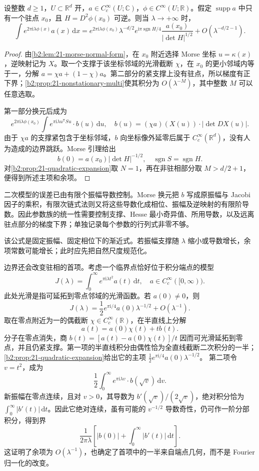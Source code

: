\begin{theorem}[驻相公式]\label{b2:thm:21-stationary-phase}
设整数 \(d\geq1\)，\(U\subset\mathbb R^d\) 开，\(a\in C_c^\infty(U;\mathbb C)\)，\(\phi\in C^\infty(U;\mathbb R)\)。假定 \(\operatorname{supp}a\) 中只有一个驻点 \(x_0\)，且 \(H=D^2\phi(x_0)\) 可逆。则当 \(\lambda\to+\infty\) 时，
\[
 \int e^{2\pi\mathrm i\lambda\phi(x)}a(x)\,\mathrm dx
 =e^{2\pi\mathrm i\lambda\phi(x_0)}
   \lambda^{-d/2}e^{\mathrm i\pi\operatorname{sgn}H/4}
   \frac{a(x_0)}{|\det H|^{1/2}}
   +O(\lambda^{-d/2-1}).
\]
\end{theorem}
\begin{proof}
由\cref{b2:lem:21-morse-normal-form}，在 \(x_0\) 附近选择 Morse 坐标 \(u=\kappa(x)\)，逆映射记为 \(X\)。取一个支撑于该坐标邻域的光滑截断 \(\chi\)，在 \(x_0\) 的更小邻域内等于一，分解
\(a=\chi a+(1-\chi)a\)。第二部分的紧支撑上没有驻点，所以梯度有正下界；\cref{b2:prop:21-nonstationary-multi}使其积分为 \(O(\lambda^{-M})\)，其中整数 \(M\) 可以任意选取。

第一部分换元后成为
\[
 e^{2\pi\mathrm i\lambda\phi(x_0)}
 \int e^{\pi\mathrm i\lambda u^{\mathsf T}Su}
                   \cdot b(u)\,\mathrm du,
 \quad
 b(u)=(\chi a)(X(u))\cdot|\det DX(u)|.
\]
由于 \(\chi a\) 的支撑紧包含于坐标邻域，\(b\) 向坐标像外延零后属于 \(C_c^\infty(\mathbb R^d)\)，没有人为造成的边界跳跃。Morse 引理给出
\[
 b(0)=a(x_0)|\det H|^{-1/2},
 \quad
 \operatorname{sgn}S=\operatorname{sgn}H.
\]
对\cref{b2:prop:21-quadratic-expansion}取 \(N=1\)，再在非驻相部分取 \(M>d/2+1\)，便得到所述主项和余项。
\end{proof}
二次模型的误差已由有限个振幅导数控制。Morse 换元把 \(b\) 写成原振幅与 Jacobi 因子的乘积，有限次链式法则又将这些导数化成相位、振幅及逆映射的有限阶导数。因此参数族的统一性需要控制支撑、Hesse 最小奇异值、所用导数，以及远离驻点部分的梯度下界；单独记录每个参数的行列式非零不够。

该公式是固定振幅、固定相位下的渐近式。若振幅支撑随 \(\lambda\) 缩小或导数增长，余项常数可能增长；此时应先把自然尺度规范化。

边界还会改变驻相的首项。考虑一个临界点恰好位于积分端点的模型
\[
 J(\lambda)=\int_0^\infty e^{\pi\mathrm i\lambda t^2}a(t)\,\mathrm dt,
 \quad a\in C_c^\infty([0,\infty)).
\]
此处光滑是指可延拓到零点邻域的光滑函数。若 \(a(0)\ne0\)，则
\[
 J(\lambda)=\frac12e^{\pi\mathrm i/4}a(0)\lambda^{-1/2}+O(\lambda^{-1}).
\]
取在零点附近为一的偶截断 \(\chi\in C_c^\infty(\mathbb R)\)，在半直线上分解
\[
 a(t)=a(0)\chi(t)+t b(t).
\]
分子在零点消失，商 \(b(t)=[a(t)-a(0)\chi(t)]/t\) 因而可光滑延拓到零点，并且仍紧支撑。第一项的半直线积分由偶性恰为全直线截断二次积分的一半；\cref{b2:prop:21-quadratic-expansion}给出它的主项
\(\tfrac12e^{\pi\mathrm i/4}a(0)\lambda^{-1/2}\)。
第二项令 \(v=t^2\)，成为
\[
 \frac12\int_0^\infty e^{\pi\mathrm i\lambda v}
                         \cdot b(\sqrt v)\,\mathrm dv.
\]
新振幅在零点连续，且对 \(v>0\)，其导数为
\(b'(\sqrt v)/(2\sqrt v)\)，绝对积分恰为
\(\int_0^\infty|b'(t)|\,\mathrm dt\)。因此它绝对连续，虽有可能的 \(v^{-1/2}\) 导数奇性，仍可作一阶分部积分，得到界
\[
 \frac1{2\pi\lambda}
       \left[|b(0)|+\int_0^\infty|b'(t)|\,\mathrm dt\right].
\]
这证明了余项为 \(O(\lambda^{-1})\)，也确定了首项中的一半来自端点几何，而不是 Fourier 归一化的改变。

